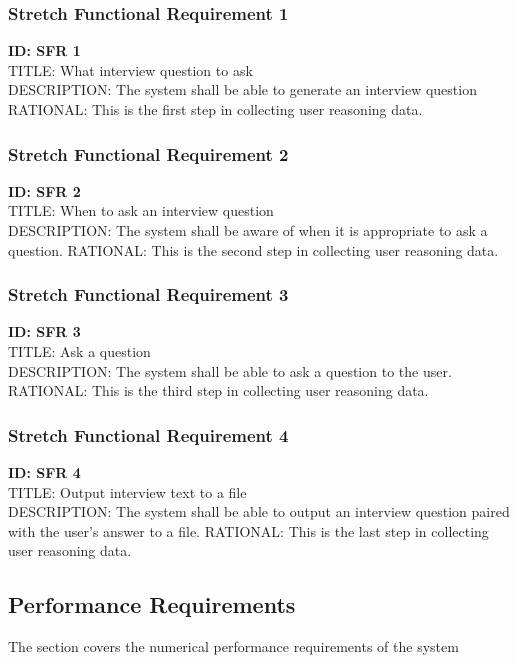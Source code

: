 \documentclass[onecolumn, draftclsnofoot,10pt, compsoc]{IEEEtran}
\begin{document}
        
        \subsubsection{Stretch Functional Requirement 1}
    	\textbf{ID: SFR 1} \\
        TITLE: What interview question to ask \\
        DESCRIPTION: The system shall be able to generate an interview question
        RATIONAL: This is the first step in collecting user reasoning data. 
        
        
        \subsubsection{Stretch Functional Requirement 2}
    	\textbf{ID: SFR 2} \\
        TITLE: When to ask an interview question \\
        DESCRIPTION: The system shall be aware of when it is appropriate to ask a question.
        RATIONAL: This is the second step in collecting user reasoning data. 
        
        \subsubsection{Stretch Functional Requirement 3}
    	\textbf{ID: SFR 3} \\
        TITLE: Ask a question \\
        DESCRIPTION: The system shall be able to ask a question to the user.
        RATIONAL: This is the third step in collecting user reasoning data. 
        
        \subsubsection{Stretch Functional Requirement 4}
    	\textbf{ID: SFR 4} \\
        TITLE: Output interview text to a file \\
        DESCRIPTION: The system shall be able to output an interview question paired with the user's answer to a file.
        RATIONAL: This is the last step in collecting user reasoning data. 
        

   		 \subsection{Performance Requirements}
    		The section covers the numerical performance requirements of the system
        
\end{document}
